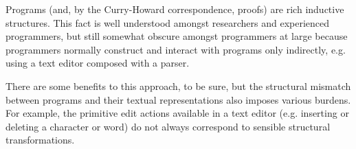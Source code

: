 Programs (and, by the Curry-Howard correspondence, proofs) are rich
inductive structures. This fact is well understood amongst researchers and
experienced programmers, but still somewhat obscure amongst programmers at
large because programmers normally construct and interact with programs
only indirectly, e.g. using a text editor composed with a parser.

There are some benefits to this approach, to be sure, but the structural
mismatch between programs and their textual representations also imposes
various burdens.  For example, the primitive edit actions available in a
text editor (e.g. inserting or deleting a character or word) do not always
correspond to sensible structural transformations.
